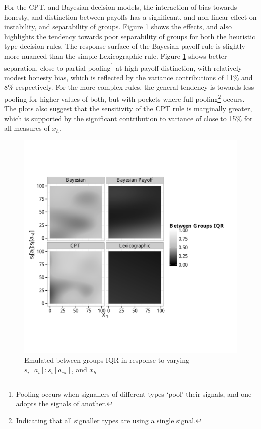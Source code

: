 For the \ac{CPT}, and Bayesian decision models, the interaction of bias towards honesty, and distinction between payoffs has a significant, and non-linear effect on instability, and separability of groups. Figure \ref{fig:emulated_payoff_group_iqr} shows the effects, and also highlights the tendency towards poor separability of groups for both the heuristic type decision rules. The response surface of the Bayesian payoff rule is slightly more nuanced than the simple Lexicographic rule. Figure \ref{fig:emulated_payoff_group_iqr} shows better separation, close to partial pooling\footnote{Pooling occurs when signallers of different types `pool' their signals, and one adopts the signals of another.} at high payoff distinction, with relatively modest honesty bias, which is reflected by the variance contributions of 11\% and 8\% respectively.  For the more complex rules, the general tendency is towards less pooling for higher values of both, but with pockets where full pooling\footnote{Indicating that all signaller types are using a single signal.} occurs.  The plots also suggest that the sensitivity of the \ac{CPT} rule is marginally greater, which is supported by the significant contribution to variance of close to 15\% for all measures of \(x_{h}\).

\begin{figure}[H]
\begin{adjustbox}{center}\includegraphics[width=119mm]{figures/unfixed_emu_payoff_honesty_group_iqr}\end{adjustbox}
\caption{Emulated between groups IQR in response to varying \(s_{i}[a_{i}]:s_{i}[a_{\neg i}]\), and \(x_{h}\)}
\label{fig:emulated_payoff_group_iqr}
\end{figure}
